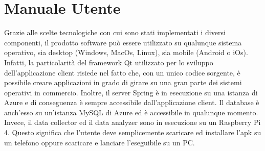 \section{Manuale Utente}
Grazie alle scelte tecnologiche con cui sono stati implementati i diversi componenti, il prodotto software può essere utilizzato su qualunque sistema operativo, sia desktop (Windows, MacOs, Linux), sia mobile (Android o iOs).
Infatti, la particolarità del framework Qt utilizzato per lo sviluppo dell'applicazione client risiede nel fatto che, con un unico codice sorgente, è possibile creare applicazioni in grado di girare su una gran parte dei sistemi operativi in commercio. 
Inoltre, il server Spring è in esecuzione su una istanza di Azure e di conseguenza è sempre accessibile dall'applicazione client.
Il database è anch'esso su un'istanza MySQL di Azure ed è accessibile in qualunque momento.
Invece, il data collector ed il data analyzer sono in esecuzione su un Raspberry Pi 4.
Questo significa che l'utente deve semplicemente scaricare ed installare l'apk su un telefono oppure scaricare e lanciare l'eseguibile su un PC.
